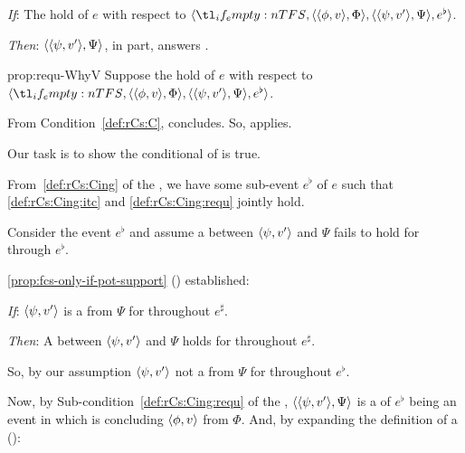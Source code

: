 \begin{note}
  \begin{proposition}
    \label{prop:requ-WhyV}
    \vspace{-\baselineskip}
    \begin{itenum}
    \item[\emph{If}:]
      The  hold of \(e\) with respect to \(\langle \vAgent{}, \pvp{\phi}{v}{\Phi}, \pvp{\psi}{v'}{\Psi}, e^{\flat} \rangle\).
    \item[\emph{Then}:]
      \(\langle \langle \psi, v' \rangle, \Psi \rangle\), in part, answers \qWhyV{}.
    \end{itenum}
    \vspace{-\baselineskip}
  \end{proposition}

  \begin{argument}{prop:requ-WhyV}
    Suppose the  hold of \(e\) with respect to \(\langle \vAgent{}, \pvp{\phi}{v}{\Phi}, \pvp{\psi}{v'}{\Psi}, e^{\flat} \rangle\).

    From Condition~\ref{def:rCs:C}, concludes.
    So, \qWhyV{} applies.

    Our task is to show the conditional of \qWhyV{} is true.

    From~\ref{def:rCs:Cing} of the \rCon{}, we have some sub-event \(e^{\flat}\) of \(e\) such that \ref{def:rCs:Cing:itc} and \ref{def:rCs:Cing:requ} jointly hold.

    Consider the event \(e^{\flat}\) and assume a \ros{} between \(\langle \psi, v' \rangle\) and \(\Psi\) fails to hold for \vAgent{} through \(e^{\flat}\).

    \autoref{prop:fcs-only-if-pot-support} () established:

    \begin{itenum}
    \item[\emph{If}:]
      \(\langle \psi, v' \rangle\) is a  from \(\Psi\) for \vAgent{} throughout \(e^{\sharp}\).
    \item[\emph{Then}:]
      A  between \(\langle \psi, v' \rangle\) and \(\Psi\) holds for \vAgent{} throughout \(e^{\sharp}\).
    \end{itenum}

    \noindent%
    So, by our assumption \(\langle \psi, v' \rangle\) not a  from \(\Psi\) for \vAgent{} throughout \(e^{\flat}\).

    Now, by Sub-condition~\ref{def:rCs:Cing:requ} of the \rCon{}, \(\langle \langle \psi, v' \rangle, \Psi \rangle\) is a \requ{} of \(e^{\flat}\) being an event in which \vAgent{} is concluding \(\langle \phi, v \rangle\) from \(\Phi\).
    And, by expanding the definition of a \requ{} ():


\end{argument}
\end{note}
